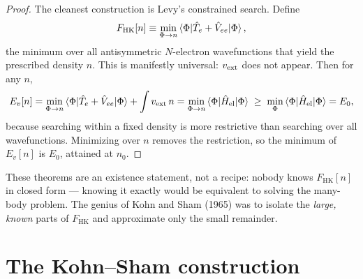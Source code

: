 \begin{proof}
The cleanest construction is Levy's constrained search. Define
\begin{equation}
F_{\mathrm{HK}}[n] \equiv
\min_{\Phi \to n} \braket{\Phi | \hat T_e + \hat V_{ee} | \Phi},
\label{eq:levysearch}
\end{equation}
the minimum over all antisymmetric $N$-electron wavefunctions that yield the
prescribed density $n$. This is manifestly universal: $v_{\mathrm{ext}}$ does not appear.
Then for any $n$,
\begin{equation}
E_v[n]
= \min_{\Phi\to n}\braket{\Phi|\hat T_e + \hat V_{ee}|\Phi}
+ \int v_{\mathrm{ext}}\, n
= \min_{\Phi\to n}\braket{\Phi|\hat{H}_{\mathrm{el}}|\Phi}
\;\geq\; \min_{\Phi}\braket{\Phi|\hat{H}_{\mathrm{el}}|\Phi} = E_0 ,
\end{equation}
because searching within a fixed density is more restrictive than searching
over all wavefunctions. Minimizing over $n$ removes the restriction, so the
minimum of $E_v[n]$ is $E_0$, attained at $n_0$.
\end{proof}

\begin{remark}
These theorems are an existence statement, not a recipe: nobody knows
$F_{\mathrm{HK}}[n]$ in closed form --- knowing it exactly would be
equivalent to solving the many-body problem. The genius of Kohn and Sham
(1965) was to isolate the \emph{large, known} parts of $F_{\mathrm{HK}}$ and
approximate only the small remainder.
\end{remark}

\section{The Kohn--Sham construction}
\label{sec:ks}

